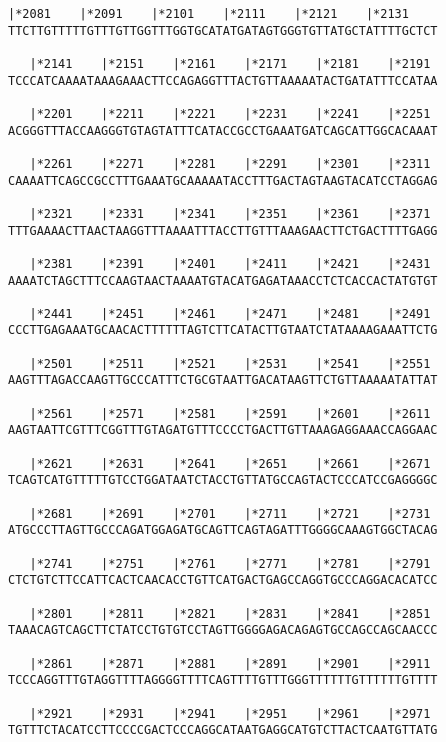 \documentclass{article}
\begin{document}
\begin{Verbatim}[fontfamily=courier]
   |*2081    |*2091    |*2101    |*2111    |*2121    |*2131 
TTCTTGTTTTTGTTTGTTGGTTTGGTGCATATGATAGTGGGTGTTATGCTATTTTGCTCT

   |*2141    |*2151    |*2161    |*2171    |*2181    |*2191 
TCCCATCAAAATAAAGAAACTTCCAGAGGTTTACTGTTAAAAATACTGATATTTCCATAA

   |*2201    |*2211    |*2221    |*2231    |*2241    |*2251 
ACGGGTTTACCAAGGGTGTAGTATTTCATACCGCCTGAAATGATCAGCATTGGCACAAAT

   |*2261    |*2271    |*2281    |*2291    |*2301    |*2311 
CAAAATTCAGCCGCCTTTGAAATGCAAAAATACCTTTGACTAGTAAGTACATCCTAGGAG

   |*2321    |*2331    |*2341    |*2351    |*2361    |*2371 
TTTGAAAACTTAACTAAGGTTTAAAATTTACCTTGTTTAAAGAACTTCTGACTTTTGAGG

   |*2381    |*2391    |*2401    |*2411    |*2421    |*2431 
AAAATCTAGCTTTCCAAGTAACTAAAATGTACATGAGATAAACCTCTCACCACTATGTGT

   |*2441    |*2451    |*2461    |*2471    |*2481    |*2491 
CCCTTGAGAAATGCAACACTTTTTTAGTCTTCATACTTGTAATCTATAAAAGAAATTCTG

   |*2501    |*2511    |*2521    |*2531    |*2541    |*2551 
AAGTTTAGACCAAGTTGCCCATTTCTGCGTAATTGACATAAGTTCTGTTAAAAATATTAT

   |*2561    |*2571    |*2581    |*2591    |*2601    |*2611 
AAGTAATTCGTTTCGGTTTGTAGATGTTTCCCCTGACTTGTTAAAGAGGAAACCAGGAAC

   |*2621    |*2631    |*2641    |*2651    |*2661    |*2671 
TCAGTCATGTTTTTGTCCTGGATAATCTACCTGTTATGCCAGTACTCCCATCCGAGGGGC

   |*2681    |*2691    |*2701    |*2711    |*2721    |*2731 
ATGCCCTTAGTTGCCCAGATGGAGATGCAGTTCAGTAGATTTGGGGCAAAGTGGCTACAG

   |*2741    |*2751    |*2761    |*2771    |*2781    |*2791 
CTCTGTCTTCCATTCACTCAACACCTGTTCATGACTGAGCCAGGTGCCCAGGACACATCC

   |*2801    |*2811    |*2821    |*2831    |*2841    |*2851 
TAAACAGTCAGCTTCTATCCTGTGTCCTAGTTGGGGAGACAGAGTGCCAGCCAGCAACCC

   |*2861    |*2871    |*2881    |*2891    |*2901    |*2911 
TCCCAGGTTTGTAGGTTTTAGGGGTTTTCAGTTTTGTTTGGGTTTTTTGTTTTTTGTTTT

   |*2921    |*2931    |*2941    |*2951    |*2961    |*2971 
TGTTTCTACATCCTTCCCCGACTCCCAGGCATAATGAGGCATGTCTTACTCAATGTTATG

\end{Verbatim}
\newpage
\end{document}
